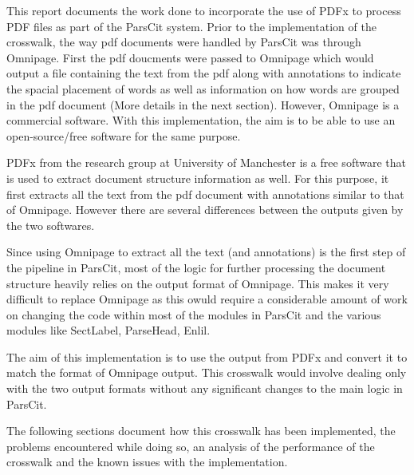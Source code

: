 This report documents the work done to incorporate the use of PDFx to process PDF files as part of the ParsCit system.
Prior to the implementation of the crosswalk, the way pdf documents were handled by ParsCit was through Omnipage.
First the pdf doucments were passed to Omnipage which would output a file containing the text from the pdf along with annotations to indicate the spacial placement of words as well as information on how words are grouped in the pdf document (More details in the next section).
However, Omnipage is a commercial software.
With this implementation, the aim is to be able to use an open-source/free software for the same purpose.

PDFx from the research group at University of Manchester is a free software that is used to extract document structure information as well.
For this purpose, it first extracts all the text from the pdf document with annotations similar to that of Omnipage.
However there are several differences between the outputs given by the two softwares.

Since using Omnipage to extract all the text (and annotations) is the first step of the pipeline in ParsCit, most of the logic for further processing the document structure heavily relies on the output format of Omnipage.
This makes it very difficult to replace Omnipage as this owuld require a considerable amount of work on changing the code within most of the modules in ParsCit and the various modules like SectLabel, ParseHead, Enlil.

The aim of this implementation is to use the output from PDFx and convert it to match the format of Omnipage output.
This crosswalk would involve dealing only with the two output formats without any significant changes to the main logic in ParsCit.

The following sections document how this crosswalk has been implemented, the problems encountered while doing so, an analysis of the performance of the crosswalk and the known issues with the implementation.
